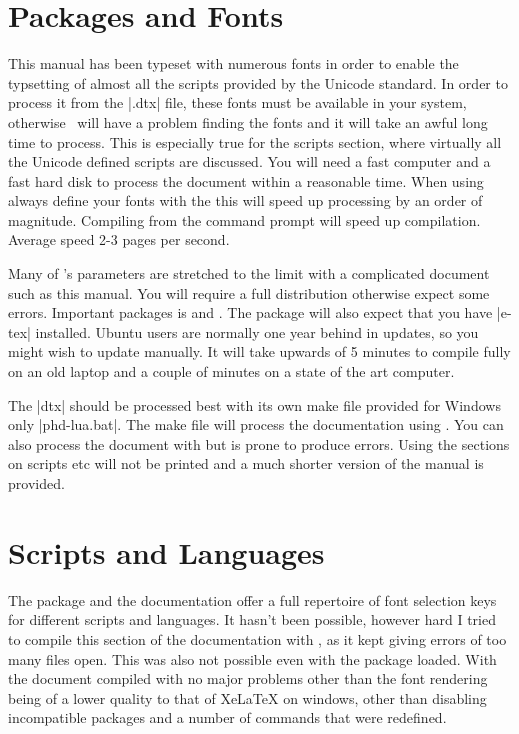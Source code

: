 \section{Packages and Fonts}

This manual has been typeset with numerous fonts in order to enable the typsetting of almost all the scripts provided by the Unicode standard. In order to process it from the |.dtx| file, these fonts must be available in your system, otherwise \XeLaTeX\ will have a problem finding the fonts and it will take an awful long time to process. This is especially true for the scripts section, where virtually all the Unicode defined scripts are discussed. You will need a fast computer and a fast hard disk to process the document within a reasonable time. When using  always define your fonts with the \cmd{\newfontfamily} this will speed up processing by an order of magnitude. Compiling from the command prompt will speed up compilation. Average speed 2-3 pages per second.

Many of \tex's parameters are stretched to the limit with a complicated document such as this manual. You will require a full distribution otherwise expect some errors. Important packages is  and . The package will also expect that you have |e-tex| installed. Ubuntu users are normally one year behind in updates, so you might wish to update manually. It will take upwards of 5 minutes to compile fully on an old laptop and a couple of minutes on a state of the art computer.

The |dtx| should be processed best with its own make file provided for Windows only |phd-lua.bat|. The make file will process the documentation using \lualatex. You can also process the document with \xelatex but is prone to produce errors. Using \latexe the sections on scripts etc will not be printed and a much shorter version of the manual is provided. 

\section{Scripts and Languages}

The package and the documentation offer a full repertoire of font selection keys for different scripts and languages. It hasn't been possible, however hard I tried to compile this section of the documentation with \xelatex, as it kept giving errors of too many files open. This was also not possible even with the  package loaded. With \lualatex the document compiled with no major problems other than the font rendering being of a lower quality to that of XeLaTeX on windows, other than disabling incompatible packages and a number of commands that were redefined. 

